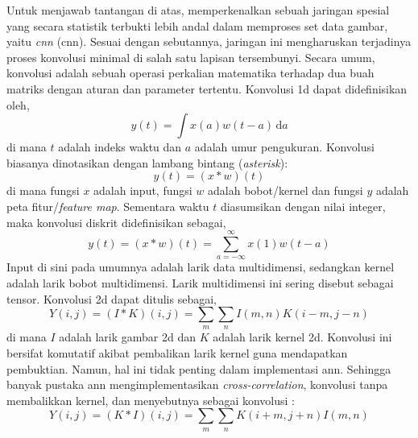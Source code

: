 Untuk menjawab tantangan di atas,  memperkenalkan sebuah jaringan spesial yang secara statistik terbukti lebih andal dalam memproses set data gambar, yaitu \textit{\acrlong{cnn}} (\acrshort{cnn}). Sesuai dengan sebutannya, jaringan ini mengharuskan terjadinya proses konvolusi minimal di salah satu lapisan tersembunyi. Secara umum, konvolusi adalah sebuah operasi perkalian matematika terhadap dua buah matriks dengan aturan dan parameter tertentu. Konvolusi \acrshort{1d} dapat didefinisikan oleh,
\begin{equation}
    y(t) = \int{x(a)w(t-a)}\,\mathrm{d}a
\end{equation}
di mana $t$ adalah indeks waktu dan $a$ adalah umur pengukuran. Konvolusi biasanya dinotasikan dengan lambang bintang (\textit{asterisk}):
\begin{equation}
    y(t) = (x \ast w)(t)
\end{equation}
di mana fungsi $x$ adalah input, fungsi $w$ adalah bobot/kernel dan fungsi $y$ adalah peta fitur/\textit{feature map}. Sementara waktu $t$ diasumsikan dengan nilai integer, maka konvolusi diskrit didefinisikan sebagai,
\begin{equation}
    y(t) = (x \ast w)(t) = \sum_{a=-\infty}^{\infty}{x(1)w(t-a)}
\end{equation}
Input di sini pada umumnya adalah larik data multidimensi, sedangkan kernel adalah larik bobot multidimensi. Larik multidimensi ini sering disebut sebagai tensor. Konvolusi \acrshort{2d} dapat ditulis sebagai,
\begin{equation}
    Y(i,j) = (I \ast K)(i,j) = \sum_m{\sum_n{I(m,n)K(i-m,j-n)}}
\end{equation}
di mana $I$ adalah larik gambar \acrshort{2d} dan $K$ adalah larik kernel \acrshort{2d}. Konvolusi ini bersifat komutatif akibat pembalikan larik kernel guna mendapatkan pembuktian. Namun, hal ini tidak penting dalam implementasi \acrshort{ann}. Sehingga banyak pustaka \acrshort{ann} mengimplementasikan \textit{cross-correlation}, konvolusi tanpa membalikkan kernel, dan menyebutnya sebagai konvolusi :
\begin{equation}
    Y(i,j) = (K \ast I)(i,j) = \sum_m{\sum_n{K(i+m,j+n)I(m,n)}}
\end{equation}

